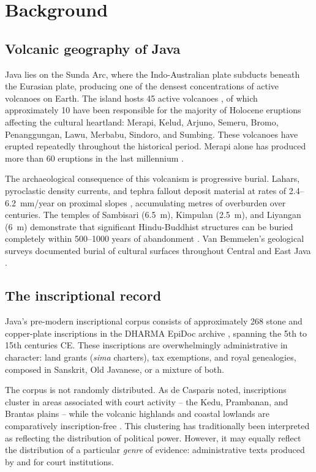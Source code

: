 \documentclass[12pt]{article}
\begin{document}
\section{Background}

\subsection{Volcanic geography of Java}

Java lies on the Sunda Arc, where the Indo-Australian plate subducts beneath the Eurasian plate, producing one of the densest concentrations of active volcanoes on Earth.
The island hosts 45 active volcanoes \citep{GVP2024}, of which approximately 10 have been responsible for the majority of Holocene eruptions affecting the cultural heartland: Merapi, Kelud, Arjuno, Semeru, Bromo, Penanggungan, Lawu, Merbabu, Sindoro, and Sumbing.
These volcanoes have erupted repeatedly throughout the historical period.
Merapi alone has produced more than 60 eruptions in the last millennium \citep{Newhall2000, Gertisser2012}.

The archaeological consequence of this volcanism is progressive burial.
Lahars, pyroclastic density currents, and tephra fallout deposit material at rates of 2.4--6.2~mm/year on proximal slopes \citep{Lavigne2000}, accumulating metres of overburden over centuries.
The temples of Sambisari (6.5~m), Kimpulan (2.5~m), and Liyangan (6~m) demonstrate that significant Hindu-Buddhist structures can be buried completely within 500--1000 years of abandonment \citep{Putra2019, Abbas2016}.
Van Bemmelen's geological surveys documented burial of cultural surfaces throughout Central and East Java \citep{VanBemmelen1949}.

\subsection{The inscriptional record}

Java's pre-modern inscriptional corpus consists of approximately 268 stone and copper-plate inscriptions in the DHARMA EpiDoc archive \citep{DHARMA2024}, spanning the 5th to 15th centuries CE.
These inscriptions are overwhelmingly administrative in character: land grants (\textit{sima} charters), tax exemptions, and royal genealogies, composed in Sanskrit, Old Javanese, or a mixture of both.

The corpus is not randomly distributed.
As de Casparis noted, inscriptions cluster in areas associated with court activity -- the Kedu, Prambanan, and Brantas plains -- while the volcanic highlands and coastal lowlands are comparatively inscription-free \citep{Casparis1975}.
This clustering has traditionally been interpreted as reflecting the distribution of political power.
However, it may equally reflect the distribution of a particular \emph{genre} of evidence: administrative texts produced by and for court institutions.
\end{document}
